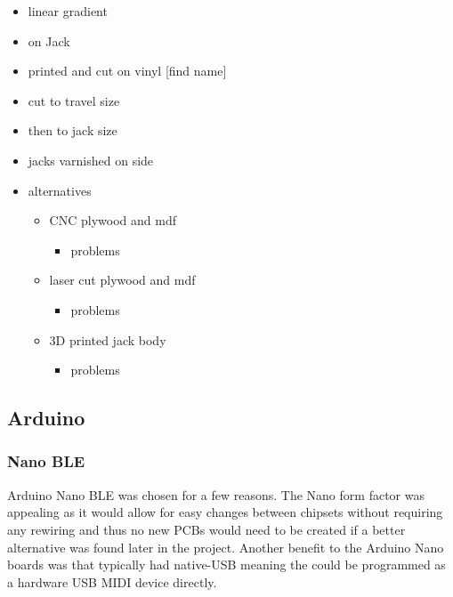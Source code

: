 \begin{itemize}
\tightlist
\item
  linear gradient
\item
  on Jack
\item
  printed and cut on vinyl {[}find name{]}
\item
  cut to travel size
\item
  then to jack size
\item
  jacks varnished on side
\item
  alternatives

  \begin{itemize}
  \tightlist
  \item
    CNC plywood and mdf

    \begin{itemize}
    \tightlist
    \item
      problems
    \end{itemize}
  \item
    laser cut plywood and mdf

    \begin{itemize}
    \tightlist
    \item
      problems
    \end{itemize}
  \item
    3D printed jack body

    \begin{itemize}
    \tightlist
    \item
      problems
    \end{itemize}
  \end{itemize}
\end{itemize}

\subsection{Arduino}\label{arduino}

\subsubsection{Nano BLE}\label{nano-ble}

Arduino Nano BLE was chosen for a few reasons. The Nano form factor was
appealing as it would allow for easy changes between chipsets without
requiring any rewiring and thus no new PCBs would need to be created if
a better alternative was found later in the project. Another benefit to
the Arduino Nano boards was that typically had native-USB meaning the
could be programmed as a hardware USB MIDI device directly.

